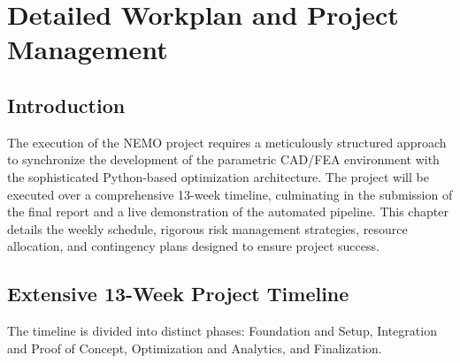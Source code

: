 \chapter{Detailed Workplan and Project Management}
\label{chap:workplan}

\section{Introduction}
The execution of the NEMO project requires a meticulously structured approach to synchronize the development of the parametric CAD/FEA environment with the sophisticated Python-based optimization architecture. The project will be executed over a comprehensive 13-week timeline, culminating in the submission of the final report and a live demonstration of the automated pipeline. This chapter details the weekly schedule, rigorous risk management strategies, resource allocation, and contingency plans designed to ensure project success.

\section{Extensive 13-Week Project Timeline}
The timeline is divided into distinct phases: Foundation and Setup, Integration and Proof of Concept, Optimization and Analytics, and Finalization.


